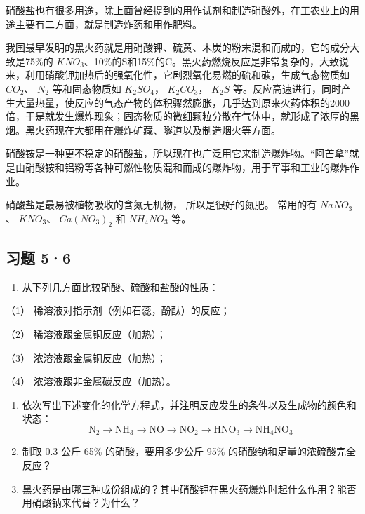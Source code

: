 硝酸盐也有很多用途，除上面曾经提到的用作试剂和制造硝酸外，在工农业上的用途主要有二方面，就是制造炸药和用作肥料。

我国最早发明的黑火药就是用硝酸钾、硫黄、木炭的粉末混和而成的，它的成分大致是75\%的
\(KNO_{3}\)、10\%的S和15\%的C。黑火药燃烧反应是非常复杂的，大致说来，利用硝酸钾加热后的强氧化性，它剧烈氧化易燃的硫和碳，生成气态物质如
\(CO_{2}\)、 \(N_{2}\) 等和固态物质如 \(K_{2}SO_{4}\)，
\(K_{2}CO_{3}\)， \(K_{2}S\)
等。反应高速进行，同时产生大量热量，使反应的气态产物的体积骤然膨胀，几乎达到原来火药体积的2000倍，于是就发生爆炸现象；固态物质的微细颗粒分散在气体中，就形成了浓厚的黑烟。黑火药现在大都用在爆炸矿藏、隧道以及制造烟火等方面。

硝酸铵是一种更不稳定的硝酸盐，所以现在也广泛用它来制造爆炸物。``阿芒拿''就是由硝酸铵和铝粉等各种可燃性物质混和而成的爆炸物，用于军事和工业的爆炸作业。

硝酸盐是最易被植物吸收的含氮无机物， 所以是很好的氮肥。 常用的有
\(NaNO_{3}\)、 \(KNO_{3}\)、 \(Ca(NO_{3})_{2}\) 和 \(NH_{4}NO_{3}\) 等。

\subsection{习题 5·6}

\begin{enumerate}
\item
  从下列几方面比较硝酸、硫酸和盐酸的性质：
\end{enumerate}

（1） 稀溶液对指示剂（例如石蕊，酚酞）的反应；

（2） 稀溶液跟金属铜反应（加热）；

（3） 浓溶液跟金属铜反应（加热）；

（4） 浓溶液跟非金属碳反应（加热）。

\begin{enumerate}[start=2]
\item
  依次写出下述变化的化学方程式，并注明反应发生的条件以及生成物的颜色和状态：
\[
\mathrm{N} _ {2} \longrightarrow \mathrm{NH} _ {3} \longrightarrow \mathrm{NO} \longrightarrow \mathrm{NO} _ {2} \longrightarrow \mathrm{HNO} _ {3} \longrightarrow \mathrm{NH} _ {4} \mathrm{NO} _ {3}
\]
\item
  制取 0.3 公斤 65\% 的硝酸，要用多少公斤 95\%
  的硝酸钠和足量的浓硫酸完全反应？
\item
  黑火药是由哪三种成份组成的？其中硝酸钾在黑火药爆炸时起什么作用？能否用硝酸钠来代替？为什么？
\end{enumerate}

